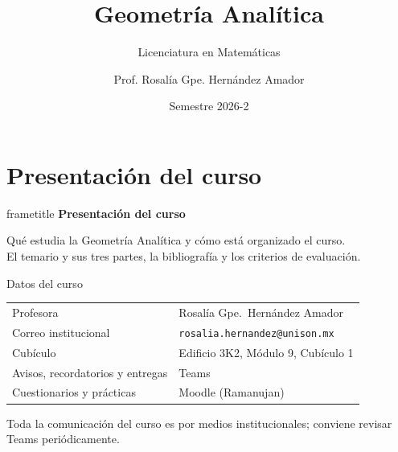 \documentclass[aspectratio=169,10pt]{beamer}
\title{\LARGE\textbf{Geometría Analítica}}
\subtitle{Licenciatura en Matemáticas}
\author{Prof. Rosalía Gpe. Hernández Amador}
\institute{Departamento de Matemáticas · Universidad de Sonora}
\date{Semestre 2026-2}
\newcommand{\destaca}[1]{%
  \par\vspace{3pt}\noindent
  \colorbox{turquesaClaro}{%
    \parbox{\dimexpr\linewidth-2\fboxsep\relax}{\vspace{3pt}#1\vspace{3pt}}}%
  \par\vspace{3pt}}
\newcommand{\hojaSesion}[2]{%
  \vfill
  \begin{beamercolorbox}[wd=\textwidth,sep=16pt,center]{frametitle}
    {\Large\bfseries #1}\\[11pt]
    \begin{minipage}{0.82\textwidth}\centering\small #2\end{minipage}
  \end{beamercolorbox}
  \vfill}
\begin{document}
\begin{frame}[plain]
  \titlepage
\end{frame}
\section{Presentación del curso}
\begin{frame}[plain]
  \hojaSesion{Presentación del curso}{%
  Qué estudia la Geometría Analítica y cómo está organizado el curso.\\
  El temario y sus tres partes, la bibliografía y los criterios de evaluación.}
\end{frame}

\begin{frame}{Datos del curso}
  \centering
  {\small
  \begin{tabular}{@{}ll@{}}
    \toprule
    Profesora & Rosalía Gpe.\ Hernández Amador \\
    Correo institucional & \texttt{rosalia.hernandez@unison.mx} \\
    Cubículo & Edificio 3K2, Módulo 9, Cubículo 1 \\
    \midrule
    Avisos, recordatorios y entregas & Teams \\
    Cuestionarios y prácticas & Moodle (Ramanujan) \\
    \bottomrule
  \end{tabular}}
 
  \vspace{0.5cm}
  \raggedright
  \destaca{Toda la comunicación del curso es por medios institucionales;
  conviene revisar Teams periódicamente. 
  }
\end{frame}
\end{document}
